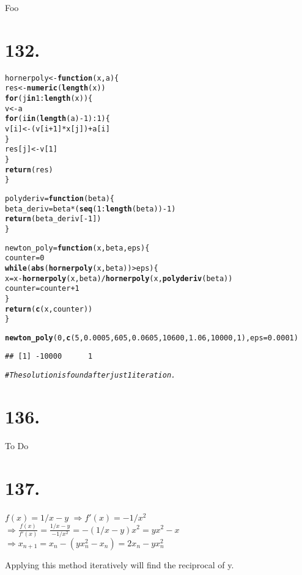 \documentclass{article}\usepackage[]{graphicx}\usepackage[]{color}
\makeatletter
\newcommand{\hlnum}[1]{\textcolor[rgb]{0.686,0.059,0.569}{#1}}%
\newcommand{\hlcom}[1]{\textcolor[rgb]{0.678,0.584,0.686}{\textit{#1}}}%
\newcommand{\hlopt}[1]{\textcolor[rgb]{0,0,0}{#1}}%
\newcommand{\hlstd}[1]{\textcolor[rgb]{0.345,0.345,0.345}{#1}}%
\newcommand{\hlkwa}[1]{\textcolor[rgb]{0.161,0.373,0.58}{\textbf{#1}}}%
\newcommand{\hlkwb}[1]{\textcolor[rgb]{0.69,0.353,0.396}{#1}}%
\newcommand{\hlkwc}[1]{\textcolor[rgb]{0.333,0.667,0.333}{#1}}%
\newcommand{\hlkwd}[1]{\textcolor[rgb]{0.737,0.353,0.396}{\textbf{#1}}}%
\newenvironment{kframe}{%
 \def\at@end@of@kframe{}%
 \ifinner\ifhmode%
  \def\at@end@of@kframe{\end{minipage}}%
  \begin{minipage}{\columnwidth}%
 \fi\fi%
 \def\FrameCommand##1{\hskip\@totalleftmargin \hskip-\fboxsep
 \colorbox{shadecolor}{##1}\hskip-\fboxsep
     \hskip-\linewidth \hskip-\@totalleftmargin \hskip\columnwidth}%
 \MakeFramed {\advance\hsize-\width
   \@totalleftmargin\z@ \linewidth\hsize
   \@setminipage}}%
 {\par\unskip\endMakeFramed%
 \at@end@of@kframe}
\newenvironment{knitrout}{}{} %
\makeatother
\begin{document}
Foo
\section{132.}
\begin{knitrout}
\color{fgcolor}\begin{kframe}
\begin{alltt}
\hlstd{hornerpoly} \hlkwb{<-} \hlkwa{function}\hlstd{(}\hlkwc{x}\hlstd{,}\hlkwc{a}\hlstd{) \{}
  \hlstd{res} \hlkwb{<-} \hlkwd{numeric}\hlstd{(}\hlkwd{length}\hlstd{(x))}
  \hlkwa{for}\hlstd{(j} \hlkwa{in} \hlnum{1}\hlopt{:}\hlkwd{length}\hlstd{(x)) \{}
    \hlstd{v} \hlkwb{<-} \hlstd{a}
    \hlkwa{for}\hlstd{(i} \hlkwa{in} \hlstd{(}\hlkwd{length}\hlstd{(a)}\hlopt{-}\hlnum{1}\hlstd{)}\hlopt{:}\hlnum{1}\hlstd{) \{}
      \hlstd{v[i]} \hlkwb{<-} \hlstd{(v[i}\hlopt{+}\hlnum{1}\hlstd{]}\hlopt{*}\hlstd{x[j])} \hlopt{+} \hlstd{a[i]}
    \hlstd{\}}
    \hlstd{res[j]}\hlkwb{<-}\hlstd{v[}\hlnum{1}\hlstd{]}
  \hlstd{\}}
  \hlkwd{return}\hlstd{(res)}
\hlstd{\}}

\hlstd{polyderiv}\hlkwb{=}\hlkwa{function}\hlstd{(}\hlkwc{beta}\hlstd{)\{}
  \hlstd{beta_deriv}\hlkwb{=}\hlstd{beta}\hlopt{*}\hlstd{(}\hlkwd{seq}\hlstd{(}\hlnum{1}\hlopt{:}\hlkwd{length}\hlstd{(beta))}\hlopt{-}\hlnum{1}\hlstd{)}
  \hlkwd{return}\hlstd{(beta_deriv[}\hlopt{-}\hlnum{1}\hlstd{])}
\hlstd{\}}

\hlstd{newton_poly} \hlkwb{=} \hlkwa{function}\hlstd{(}\hlkwc{x}\hlstd{,} \hlkwc{beta}\hlstd{,} \hlkwc{eps}\hlstd{)\{}
  \hlstd{counter} \hlkwb{=} \hlnum{0}
  \hlkwa{while}\hlstd{(}\hlkwd{abs}\hlstd{(}\hlkwd{hornerpoly}\hlstd{(x, beta))}\hlopt{>}\hlstd{eps)\{}
    \hlstd{x} \hlkwb{=} \hlstd{x}\hlopt{-}\hlkwd{hornerpoly}\hlstd{(x, beta)}\hlopt{/}\hlkwd{hornerpoly}\hlstd{(x,} \hlkwd{polyderiv}\hlstd{(beta))}
    \hlstd{counter} \hlkwb{=} \hlstd{counter} \hlopt{+} \hlnum{1}
  \hlstd{\}}
  \hlkwd{return}\hlstd{(}\hlkwd{c}\hlstd{(x, counter))}
\hlstd{\}}

\hlkwd{newton_poly}\hlstd{(}\hlnum{0}\hlstd{,} \hlkwd{c}\hlstd{(}\hlnum{5}\hlstd{,} \hlnum{0.0005}\hlstd{,} \hlnum{605}\hlstd{,} \hlnum{0.0605}\hlstd{,} \hlnum{10600}\hlstd{,} \hlnum{1.06}\hlstd{,} \hlnum{10000}\hlstd{,} \hlnum{1}\hlstd{),} \hlkwc{eps}\hlstd{=}\hlnum{0.0001}\hlstd{)}
\end{alltt}
\begin{verbatim}
## [1] -10000      1
\end{verbatim}
\begin{alltt}
\hlcom{#The solution is found after just 1 iteration.}
\end{alltt}
\end{kframe}
\end{knitrout}

\section{136.}
To Do
\section{137.}
$f(x)=1/x-y$ 
$\Rightarrow f'(x)=-1/x^2$
$\Rightarrow \frac{f(x)}{f'(x)}=\frac{1/x-y}{-1/x^2}=-(1/x-y)x^2=yx^2-x$ 
$\Rightarrow x_{n+1}=x_n-(yx_n^2-x_n)=2x_n-yx_n^2$ 



Applying this method iteratively will find the reciprocal of y.
\end{document}
